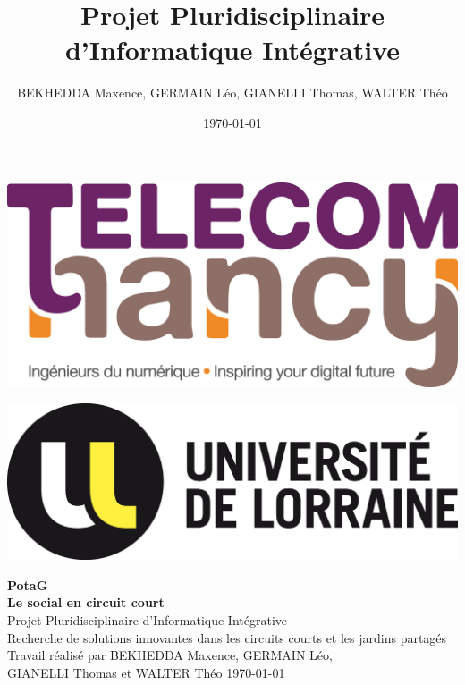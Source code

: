 \documentclass[11pt]{article}
\title{Projet Pluridisciplinaire d'Informatique Intégrative}
\author{BEKHEDDA Maxence, GERMAIN Léo, GIANELLI Thomas, WALTER Théo}
\date{\today}
\begin{document}
\thispagestyle{empty}
\vspace*{-1.5cm}

\hspace{-1.5cm}\includegraphics[scale=0.2]{logo_tn.jpg}
	
\vspace*{-1.6cm}
	
\hspace{13.5cm}\includegraphics[scale=0.2]{logo_ul.png}



\vspace*{5cm}	%
\begin{center}	%
{\Huge \bf PotaG \\\vspace{0.2cm} Le social en circuit court}\\	%
\vspace{3cm}
\Large Projet Pluridisciplinaire d'Informatique Intégrative \\Recherche de solutions innovantes dans les circuits courts et les jardins partagés\\
\vspace{3cm}
Travail réalisé par BEKHEDDA Maxence,
GERMAIN Léo, \\GIANELLI Thomas et WALTER Théo
\vfill	%
\today
\end{center}
\newpage
\end{document}

